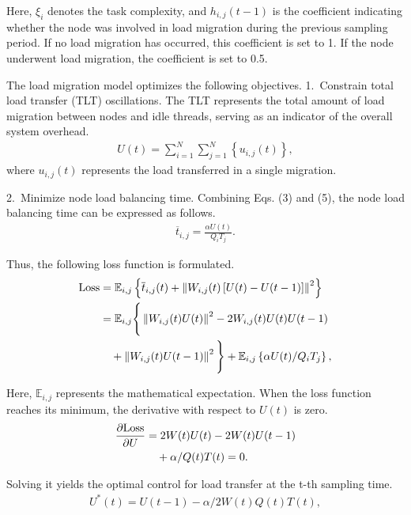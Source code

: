 \documentclass[twoside,twocolumn]{article}
\begin{document}
Here, $\xi_i$ denotes the task complexity, and $h_{i,j}(t-1)$ is the coefficient indicating whether the node was involved in load migration during the previous sampling period. If no load migration has occurred, this coefficient is set to 1. If the node underwent load migration, the coefficient is set to 0.5.

The load migration model optimizes the following objectives.
1.~Constrain total load transfer (TLT) oscillations. The TLT represents the total amount of load migration between nodes and idle threads, serving as an indicator of the overall system overhead.
\begin{align}
U(t) = \sum_{i=1}^{N}\sum_{j=1}^{N}\left\{u_{i,j}(t)\right\},
\end{align}
where $u_{i,j}(t)$ represents the load transferred in a single migration.

2.~Minimize node load balancing time. Combining Eqs. (3) and (5), the node load balancing time can be expressed as follows.	
\begin{align}
\overline{t}_{i,j} = \frac{\alpha U(t)}{Q_i T_j}.
\end{align}

Thus, the following loss function is formulated.
\begin{align}
\text{Loss} &= \mathbb{E}_{i,j}\left\{\overline{t}_{i,j}(t) + \left\|W_{i,j}(t)\left[U(t)-U(t-1)\right]\right\|^2\right\} \\
&= \mathbb{E}_{i,j}\Bigg\{\left\|W_{i,j}(t)U(t)\right\|^2 - 2W_{i,j}(t)U(t)U(t-1) \notag \\
&\quad + \left\|W_{i,j}(t)U(t-1)\right\|^2\Bigg\} + \mathbb{E}_{i,j}\left\{\alpha U(t)/Q_i T_j\right\},
\end{align}

Here, $\mathbb{E}_{i,j}$ represents the mathematical expectation. When the loss function reaches its minimum, the derivative with respect to $U(t)$ is zero.
\begin{align}
\frac{\partial \text{Loss}}{\partial U} &= 2W(t)U(t) - 2W(t)U(t-1) \notag \\
&\quad + \alpha / Q(t)T(t) = 0.
\end{align}

Solving it yields the optimal control for load transfer at the t-th sampling time.
\begin{align}
U^{*}(t) = U(t-1) - \alpha/2W(t)Q(t)T(t),
\end{align}
\end{document}
